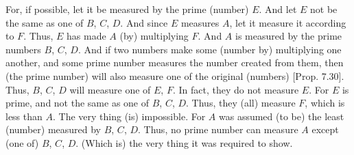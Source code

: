 \begin{Parallel}{}{}
{For, if possible, let it be measured by the prime (number) $E$. And
let $E$ not be the same as one of $B$, $C$, $D$. And since $E$ measures
$A$, let it measure it according to $F$.  Thus, $E$ has made $A$ (by)
multiplying $F$. And $A$ is measured by the prime numbers $B$, $C$, $D$.
And if two numbers make some (number by) multiplying one another,
and some prime number  measures the number created from them, then (the prime number)
will also measure one of the original (numbers) [Prop. 7.30]. Thus, $B$, $C$, $D$ will measure one of
$E$, $F$. In fact, they do not measure $E$. For $E$ is prime, and not the
same as one of $B$, $C$, $D$. Thus, they (all) measure $F$, which is less than $A$. The very thing (is) impossible. For $A$ was assumed
(to be) the least (number) measured by $B$, $C$, $D$. Thus, no prime number can measure $A$ except (one of) $B$, $C$, $D$. (Which is) the very thing it was required to show.}
\end{Parallel}

